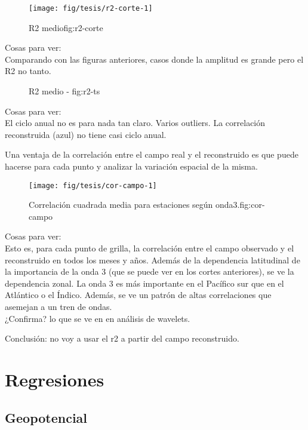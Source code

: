 \documentclass[spanish,a4paper]{book}
\begin{document}
\begin{figure*}
\texttt{[image: fig/tesis/r2-corte-1]} \caption{R2 medio{fig:r2-corte}}\label{fig:r2-corte}
\end{figure*}

Cosas para ver:\\
Comparando con las figuras anteriores, casos donde la amplitud es grande
pero el R2 no tanto.

\begin{figure*}
\newline{}\caption{R2 medio - fig:r2-ts}\label{fig:r2-ts}
\end{figure*}

Cosas para ver:\\
El ciclo anual no es para nada tan claro. Varios outliers. La
correlación reconstruida (azul) no tiene casi ciclo anual.

Una ventaja de la correlación entre el campo real y el reconstruido es
que puede hacerse para cada punto y analizar la variación espacial de la
misma.

\begin{figure}
\texttt{[image: fig/tesis/cor-campo-1]} \caption{Correlación cuadrada media para estaciones según onda3.{fig:cor-campo}}\label{fig:cor-campo}
\end{figure}

Cosas para ver:\\
Esto es, para cada punto de grilla, la correlación entre el campo
observado y el reconstruido en todos los meses y años. Además de la
dependencia latitudinal de la importancia de la onda 3 (que se puede ver
en los cortes anteriores), se ve la dependencia zonal. La onda 3 es más
importante en el Pacífico sur que en el Atlántico o el Índico. Además,
se ve un patrón de altas correlaciones que asemejan a un tren de
ondas.\\
¿Confirma? lo que se ve en en análisis de wavelets.

Conclusión: no voy a usar el r2 a partir del campo reconstruido.

\section{Regresiones}\label{regresiones}

\subsection{Geopotencial}\label{geopotencial}
\end{document}
